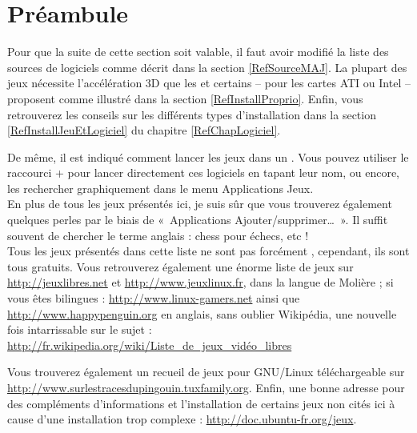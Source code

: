 \section{Préambule}
Pour que la suite de cette section soit valable, il faut avoir modifié la liste des sources de logiciels comme décrit dans la section \ref{RefSourceMAJ}. La plupart des jeux nécessite l'accélération 3D que les   et certains  -- pour les cartes ATI ou Intel -- proposent comme illustré dans la section \ref{RefInstallProprio}. Enfin, vous retrouverez les conseils sur les différents types d'installation dans la section \ref{RefInstallJeuEtLogiciel} du chapitre \ref{RefChapLogiciel}.\par
De même, il est indiqué comment lancer les jeux dans un . Vous pouvez utiliser le raccourci  +  pour lancer directement ces logiciels en tapant leur nom, ou encore, les rechercher graphiquement dans le menu Applications \FlecheDroite Jeux.\\
En plus de tous les jeux présentés ici, je suis sûr que vous trouverez également quelques perles par le biais de «~Applications \FlecheDroite Ajouter/supprimer\dots{}~». Il suffit souvent de chercher le terme anglais : chess pour échecs, etc !\\
Tous les jeux présentés dans cette liste ne sont pas forcément , cependant, ils sont tous gratuits. Vous retrouverez également une  énorme liste de jeux sur \url{http://jeuxlibres.net} et \url{http://www.jeuxlinux.fr}, dans la langue de Molière ; si vous êtes bilingues : \url{http://www.linux-gamers.net} ainsi que \url{http://www.happypenguin.org} en anglais, sans oublier Wikipédia, une nouvelle fois intarrissable sur le sujet : \url{http://fr.wikipedia.org/wiki/Liste_de_jeux_vidéo_libres}\par
Vous trouverez également un recueil de jeux pour GNU/Linux téléchargeable sur \url{http://www.surlestracesdupingouin.tuxfamily.org}. Enfin, une bonne adresse pour des compléments d'informations et l'installation de certains jeux non cités ici à cause d'une installation trop complexe : \url{http://doc.ubuntu-fr.org/jeux}.
